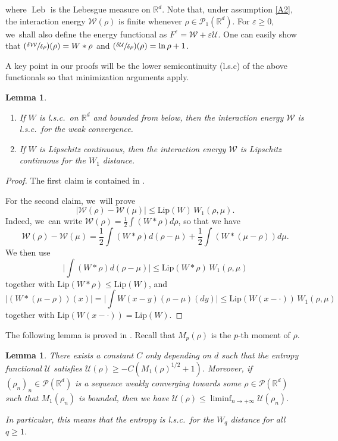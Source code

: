 \documentclass[11pt]{article}
\newcommand{\skpt}{\smallskip}
\numberwithin{equation}{section}
\newcommand{\Psfrac}[2]{(\sfrac{#1}{#2})}
\DeclareMathOperator{\Leb}{Leb}
\def\RR{\mathbb{R}}
\def\eps{\varepsilon}
\def\calP{{\mathcal P}}
\def\calU{{\mathcal U}}
\def\calW{{\mathcal W}}
\theoremstyle{plain}
\newtheorem{lemma}[theorem]{Lemma}
\theoremstyle{definition}
\begin{document}
where $\Leb$ is the Lebesgue measure on $\RR^d$. Note that, under assumption \eqref{A2}, the interaction energy $\calW(\rho)$ is finite whenever $\rho \in \calP_1(\RR^d)$. For $\eps \geq 0$, we~shall also define the energy functional as $F^\eps = \calW + \eps \calU$. One can easily show that $\Psfrac{\delta \calW}{\delta \rho}(\rho) = W * \rho$ and $\Psfrac{\delta \calU}{\delta \rho}(\rho) = \ln \rho + 1$.

A key point in our proofs will be the lower semicontinuity (l.s.c) of the above functionals so that minimization arguments apply.

\skpt
\begin{lemma}\label{lemma:W_lsc}
\begin{enumerate}
\item If $W$ is l.s.c.\ on $\RR^d$ and bounded from below, then the interaction energy $\calW$ is l.s.c.\ for the weak convergence.
\item If $W$ is Lipschitz continuous, then the interaction energy $\calW$ is Lipschitz continuous for the $W_1$ distance.
\end{enumerate}
\end{lemma}
\begin{proof}
The first claim is contained in \cite[Prop.\,7.2]{otam15}.

For the second claim, we~will prove
\[
|\calW(\rho)-\calW(\mu)|\leq \mathrm{Lip}(W)\,W_1(\rho,\mu).
\]
Indeed, we~can write $\calW(\rho)=\frac12 \int (W*\rho)d\rho$, so that we have
\[
\calW(\rho)-\calW(\mu)=\frac12 \int(W*\rho)d(\rho-\mu)+\frac12\int(W*(\mu-\rho))d\mu.
\]
We then use
\[
\biggl|\int(W*\rho)d(\rho-\mu)\biggr|\leq\mathrm{Lip}(W*\rho)\,W_1(\rho,\mu)
\]
together with $\mathrm{Lip}(W*\rho)\leq \mathrm{Lip}(W)$, and
\[
|(W*(\mu-\rho))(x)|=\biggl|\int W(x-y)(\rho-\mu)(dy)\biggr|\leq \mathrm{Lip}(W(x-\cdot))\,W_1(\rho,\mu)
\]
together with $\mathrm{Lip}(W(x-\cdot))=\mathrm{Lip}(W)$.
\end{proof}

The following lemma is proved in \cite[Prop.\,2.1]{moment}. Recall that $M_p(\rho)$ is the $p$-th moment of $\rho$.
\begin{lemma}\label{lemma:U_lsc}
There exists a constant $C$ only depending on $d$ such that the entropy functional $\calU$ satisfies $\calU(\rho)\geq -C(M_1(\rho)^{1/2}+1)$. Moreover, if
$(\rho_n)_n \in \calP(\RR^d)$ is a sequence weakly converging towards some $\rho \in \calP(\RR^d)$ such that $M_1(\rho_n)$ is bounded, then we have $\calU(\rho) \leq \liminf_{n \to +\infty} \calU(\rho_n)$.

In particular, this means that the entropy is l.s.c.\ for the $W_q$ distance for all $q \geq 1$.
\end{lemma}
\end{document}
